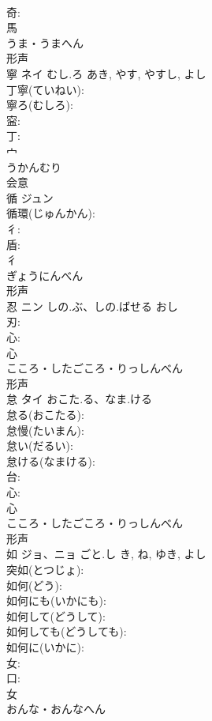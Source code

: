\documentclass[8pt]{extreport}
\begin{document}
\begin{CJK}{UTF8}{min}
\\	奇: 
\\	馬	
\\	うま・うまへん	
\\	形声 
\\	寧	ネイ	むし.ろ	あき, やす, やすし, よし	
\\	丁寧(ていねい): 
\\	寧ろ(むしろ): 
\\	寍: 
\\	丁: 
\\	宀	
\\	うかんむり	
\\	会意 
\\	循	ジュン			
\\	循環(じゅんかん): 
\\	彳: 
\\	盾: 
\\	彳	
\\	ぎょうにんべん	
\\	形声 
\\	忍	ニン	しの.ぶ、しの.ばせる	おし	
\\	刃: 
\\	心: 
\\	心	
\\	こころ・したごころ・りっしんべん	
\\	形声 
\\	怠	タイ	おこた.る、なま.ける		
\\	怠る(おこたる): 
\\	怠慢(たいまん): 
\\	怠い(だるい): 
\\	怠ける(なまける): 
\\	台: 
\\	心: 
\\	心	
\\	こころ・したごころ・りっしんべん	
\\	形声 
\\	如	ジョ、ニョ	ごと.し	き, ね, ゆき, よし	
\\	突如(とつじょ): 
\\	如何(どう): 
\\	如何にも(いかにも): 
\\	如何して(どうして): 
\\	如何しても(どうしても): 
\\	如何に(いかに): 
\\	女: 
\\	口: 
\\	女	
\\	おんな・おんなへん	

\end{CJK}
\end{document}
